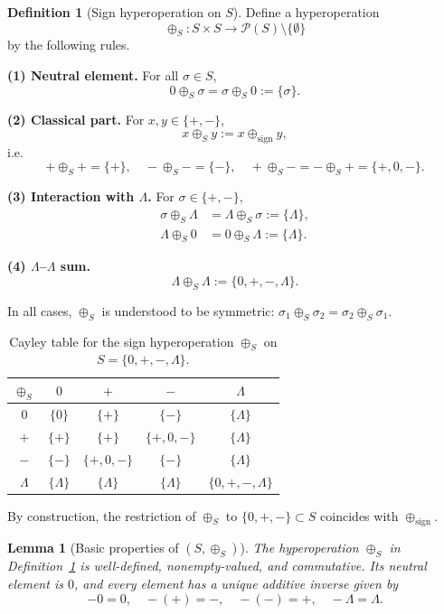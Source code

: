 \documentclass[11pt]{amsart}
\numberwithin{equation}{section}
\newtheorem{lemma}[theorem]{Lemma}
\theoremstyle{definition}
\newtheorem{definition}[theorem]{Definition}
\theoremstyle{remark}
\newcommand{\Sset}{S}                      %
\newcommand{\sop}{\oplus_S}                %
\begin{document}
\begin{definition}[Sign hyperoperation on $\Sset$]
\label{def:S-hyperoperation}
Define a hyperoperation
\[
  \sop : \Sset\times\Sset
  \longrightarrow \mathcal{P}(\Sset)\setminus\{\emptyset\}
\]
by the following rules.

\smallskip\noindent
\textbf{(1) Neutral element.} For all $\sigma\in\Sset$,
\[
  0\sop\sigma
  = \sigma\sop 0
  := \{\sigma\}.
\]

\smallskip\noindent
\textbf{(2) Classical part.} For $x,y\in\{+,-\}$,
\[
  x\sop y := x\oplus_{\mathrm{sign}}y,
\]
i.e.
\[
  +\sop + = \{+\},\quad
  -\sop - = \{-\},\quad
  +\sop - = -\sop + = \{+,0,-\}.
\]

\smallskip\noindent
\textbf{(3) Interaction with $\Lambda$.} For $\sigma\in\{+,-\}$,
\begin{align*}
  \sigma\sop\Lambda
  &= \Lambda\sop\sigma
   := \{\Lambda\},\\[2pt]
  \Lambda\sop 0
  &= 0\sop\Lambda
   := \{\Lambda\}.
\end{align*}

\smallskip\noindent
\textbf{(4) $\Lambda$--$\Lambda$ sum.}
\[
  \Lambda\sop\Lambda
  := \{0,+,-,\Lambda\}.
\]

\smallskip\noindent
In all cases, $\sop$ is understood to be symmetric:
$\sigma_1\sop\sigma_2=\sigma_2\sop\sigma_1$.
\end{definition}

\begin{table}[ht]
\centering
\caption{Cayley table for the sign hyperoperation $\sop$ on $\Sset=\{0,+,-,\Lambda\}$.}
\label{tab:sign-hyperop}
\begin{tabular}{c|cccc}
$\sop$ & $0$ & $+$ & $-$ & $\Lambda$ \\ \hline
$0$ & $\{0\}$ & $\{+\}$ & $\{-\}$ & $\{\Lambda\}$ \\
$+$ & $\{+\}$ & $\{+\}$ & $\{+,0,-\}$ & $\{\Lambda\}$ \\
$-$ & $\{-\}$ & $\{+,0,-\}$ & $\{-\}$ & $\{\Lambda\}$ \\
$\Lambda$ & $\{\Lambda\}$ & $\{\Lambda\}$ & $\{\Lambda\}$ & $\{0,+,-,\Lambda\}$ \\
\end{tabular}
\end{table}


By construction, the restriction of $\sop$ to
$\{0,+,-\}\subset\Sset$ coincides with
$\oplus_{\mathrm{sign}}$.

\begin{lemma}[Basic properties of $(\Sset,\sop)$]
\label{lem:S-basic}
The hyperoperation $\sop$ in Definition~\ref{def:S-hyperoperation} is
well-defined, nonempty-valued, and commutative.  Its neutral element
is $0$, and every element has a unique additive inverse given by
\[
  -0=0,\quad
  -(+)= -,\quad
  -(-)=+,\quad
  -\Lambda=\Lambda.
\]
\end{lemma}
\end{document}

